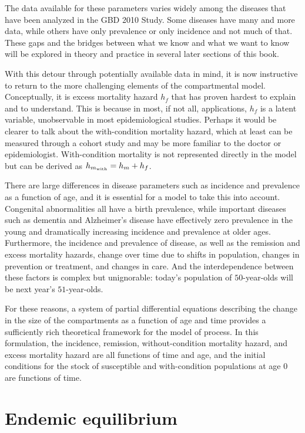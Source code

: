 The data available for these parameters varies widely among the
diseases that have been analyzed in the GBD 2010 Study. Some diseases
have many and more data, while others have only prevalence or only
incidence and not much of that. These gaps and the bridges between
what we know and what we want to know will be explored in theory and
practice in several later sections of this book.

With this detour through potentially available data in mind, it is now
instructive to return to the more challenging elements of the
compartmental model. Conceptually, it is excess mortality hazard $h_f$
that has proven hardest to explain and to understand. This is because
in most, if not all, applications, $h_f$ is a latent variable,
unobservable in most epidemiological studies. Perhaps it would
be clearer to talk about the with-condition mortality hazard, which at
least can be measured through a cohort study and may be more familiar
to the doctor or epidemiologist. With-condition mortality is not
represented directly in the model but can be derived as
$h_{m_{\text{with}}} = h_m+h_f$.

There are large differences in disease parameters such as incidence
and prevalence as a function of age, and it is essential for a model
to take this into account.  Congenital abnormalities all have a birth
prevalence, while important diseases such as dementia and Alzheimer's
disease have effectively zero prevalence in the young and
dramatically increasing incidence and prevalence at older
ages. Furthermore, the incidence and prevalence of disease, as well as
the remission and excess mortality hazards, change over time due to
shifts in population, changes in prevention or treatment, and changes
in care. And the interdependence between these factors is complex but
unignorable: today's population of $50$-year-olds will be next year's
$51$-year-olds.

For these reasons, a system of partial differential equations
describing the change in the size of the compartments as a function of
age and time provides a sufficiently rich theoretical framework for
the model of process.  In this formulation, the incidence, remission,
without-condition mortality hazard, and excess mortality hazard are all
functions of time and age, and the initial conditions for the stock of
susceptible and with-condition populations at age $0$ are functions of
time.

\section{Endemic equilibrium}
\label{theory-forward_sim-compartmental_model-simplying_assumptions}

